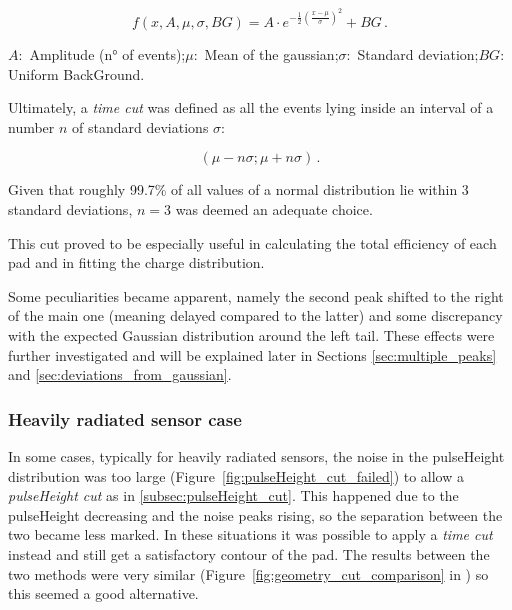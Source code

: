 \begin{equation*}
    f(x,A,\mu,\sigma,BG) = A \cdot e^{-\frac{1}{2}\left(\frac{x-\mu}{\sigma} \right)^2} + BG  \, .
\end{equation*}

$A:$ Amplitude (n° of events);\quad $\mu:$ Mean of the gaussian;\quad $\sigma:$ Standard deviation;\quad $BG:$ Uniform BackGround.

Ultimately, a \textit{time cut} was defined as all the events lying inside an interval of a number \(n\) of standard deviations \(\sigma\):

\begin{equation}
    (\mu-n\sigma;\mu+n\sigma) \, .
\end{equation}

Given that roughly 99.7\% of all values of a normal distribution lie within 3 standard deviations, $n=3$ was deemed an adequate choice.

This cut proved to be especially useful in calculating the total efficiency of each pad and in fitting the charge distribution.

Some peculiarities became apparent, namely the second peak shifted to the right of the main one (meaning delayed compared to the latter) and some discrepancy with the expected Gaussian distribution around the left tail. These effects were further investigated and will be explained later in Sections \ref{sec:multiple_peaks} and \ref{sec:deviations_from_gaussian}.

\subsubsection{Heavily radiated sensor case}\label{subsec:geometry_cut_w/pulse_cut}

In some cases, typically for heavily radiated sensors, the noise in the pulseHeight distribution was too large (Figure~\ref{fig:pulseHeight_cut_failed}) to allow a \textit{pulseHeight cut} as in \ref{subsec:pulseHeight_cut}. This happened due to the pulseHeight decreasing and the noise peaks rising, so the separation between the two became less marked. In these situations it was possible to apply a \textit{time cut} instead and still get a satisfactory contour of the pad. The results between the two methods were very similar (Figure~\ref{fig:geometry_cut_comparison} in ) so this seemed a good alternative.

